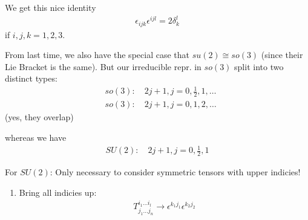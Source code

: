 We get this nice identity
\begin{align*}
    \epsilon _{ijk}\epsilon ^{ijl} = 2 \delta^{l}_k
\end{align*}
if \(i, j, k = 1, 2, 3\).

From last time, we also have the special case that \(su(2) \cong so(3)\) (since their Lie Bracket is the same). But our irreducible repr. in \(so(3)\) split into two distinct types: \begin{align*}
    &so(3): \quad 2j + 1, j = 0, \frac{1}{2}, 1, \dots\\
    &so(3): \quad 2j + 1, j = 0, 1, 2, \dots
\end{align*}
(yes, they overlap)

whereas we have \begin{align*}
    SU(2): \quad 2j + 1, j = 0, \frac{1}{2}, 1
\end{align*}

For \(SU(2)\): Only necessary to consider symmetric tensors with upper indicies!
\begin{enumerate}
    \item Bring all indicies up:\begin{align*}
        T^{i_1  \dots i_l}_{j_1 \dots j_n} \to \epsilon ^{k_1 j_1} \epsilon ^{k_2 j_2}
    \end{align*}
\end{enumerate}

